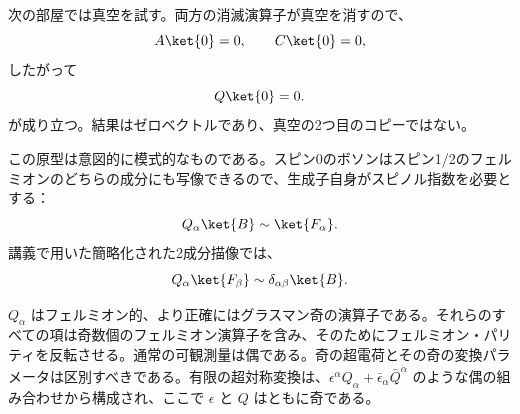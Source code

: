 \begin{classroomqa}
\end{classroomqa}

次の部屋では真空を試す。両方の消滅演算子が真空を消すので、
\begin{equation}
A\ket{0}=0,\qquad C\ket{0}=0,
\end{equation}
したがって
\begin{equation}
Q\ket{0}=0.
\end{equation}
が成り立つ。結果はゼロベクトルであり、真空の2つ目のコピーではない。

この原型は意図的に模式的なものである。スピン0のボソンはスピン1/2のフェルミオンのどちらの成分にも写像できるので、生成子自身がスピノル指数を必要とする：
\begin{equation}
Q_\alpha\ket{B}\sim\ket{F_\alpha}.
\end{equation}
講義で用いた簡略化された2成分描像では、
\begin{equation}
Q_\alpha\ket{F_\beta}\sim\delta_{\alpha\beta}\ket{B}.
\end{equation}

\begin{classroomqa}
\end{classroomqa}

\(Q_\alpha\) はフェルミオン的、より正確にはグラスマン奇の演算子である。それらのすべての項は奇数個のフェルミオン演算子を含み、そのためにフェルミオン・パリティを反転させる。通常の可観測量は偶である。奇の超電荷とその奇の変換パラメータは区別すべきである。有限の超対称変換は、\(\epsilon^\alpha Q_\alpha+\bar\epsilon_{\dot\alpha}\bar Q^{\dot\alpha}\) のような偶の組み合わせから構成され、ここで \(\epsilon\) と \(Q\) はともに奇である。

